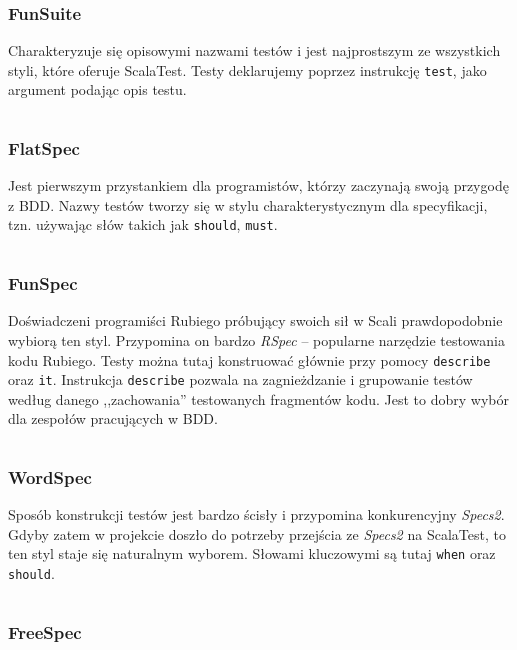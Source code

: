 \documentclass[brudnopis]{xmgr}
\begin{document}
\subsubsection{FunSuite}

Charakteryzuje się opisowymi nazwami testów i jest najprostszym ze wszystkich styli, które oferuje ScalaTest. Testy deklarujemy poprzez instrukcję \texttt{test}, jako argument podając opis testu.

\inputminted[fontsize=\small]{scala}{code/FunSuite.scala}
 
\subsubsection{FlatSpec}

Jest pierwszym przystankiem dla programistów, którzy zaczynają swoją przygodę z BDD. Nazwy testów tworzy się w stylu charakterystycznym dla specyfikacji, tzn. używając słów takich jak \texttt{should}, \texttt{must}.

\inputminted[fontsize=\small]{scala}{code/FlatSpec.scala}

\subsubsection{FunSpec}

Doświadczeni programiści Rubiego próbujący swoich sił w Scali prawdopodobnie wybiorą ten styl. Przypomina on bardzo \emph{RSpec} -- popularne narzędzie testowania kodu Rubiego. Testy można tutaj konstruować głównie przy pomocy \texttt{describe} oraz \texttt{it}. Instrukcja \texttt{describe} pozwala na zagnieżdzanie i grupowanie testów według danego ,,zachowania'' testowanych fragmentów kodu. Jest to dobry wybór dla zespołów pracujących w BDD.

\inputminted[fontsize=\small]{scala}{code/FunSpec.scala}

\subsubsection{WordSpec}

Sposób konstrukcji testów jest bardzo ścisły i przypomina konkurencyjny \emph{Specs2}. Gdyby zatem w projekcie doszło do potrzeby przejścia ze \emph{Specs2} na ScalaTest, to ten styl staje się naturalnym wyborem. Słowami kluczowymi są tutaj \texttt{when} oraz \texttt{should}.

\inputminted[fontsize=\small]{scala}{code/WordSpec.scala}

\subsubsection{FreeSpec}
\end{document}
